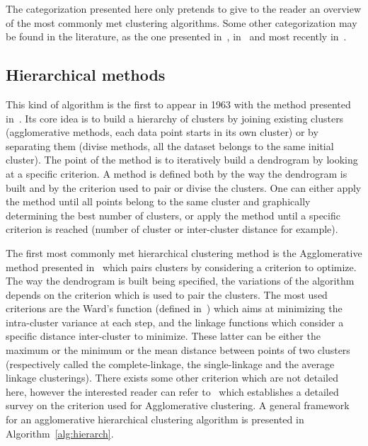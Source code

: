     The categorization presented here only pretends to give to the reader an overview of the most commonly met clustering algorithms. Some other categorization may be found in the literature, as the one presented in~\cite{jain1999data}, in~\cite{xu2005survey} and most recently in~\cite{fahad2014survey}.

    \subsection{Hierarchical methods}

    This kind of algorithm is the first to appear in 1963 with the method presented in~\cite{ward1963hierarchical}. Its core idea is to build a hierarchy of clusters by joining existing clusters (agglomerative methods, each data point starts in its own cluster) or by separating them (divise methods, all the dataset belongs to the same initial cluster). The point of the method is to iteratively build a dendrogram by looking at a specific criterion. A method is defined both by the way the dendrogram is built and by the criterion used to pair or divise the clusters. One can either apply the method until all points belong to the same cluster and graphically determining the best number of clusters, or apply the method until a specific criterion is reached (number of cluster or inter-cluster distance for example).

    The first most commonly met hierarchical clustering method is the Agglomerative method presented in~\cite{ward1963hierarchical} which pairs clusters by considering a criterion to optimize. The way the dendrogram is built being specified, the variations of the algorithm depends on the criterion which is used to pair the clusters. The most used criterions are the Ward's function (defined in~\cite{ward1963hierarchical}) which aims at minimizing the intra-cluster variance at each step, and the linkage functions which consider a specific distance inter-cluster to minimize. These latter can be either the maximum or the minimum or the mean distance between points of two clusters (respectively called the complete-linkage, the single-linkage and the average linkage clusterings). There exists some other criterion which are not detailed here, however the interested reader can refer to~\cite{murtagh1983survey} which establishes a detailed survey on the criterion used for Agglomerative clustering. A general framework for an agglomerative hierarchical clustering algorithm is presented in Algorithm~\ref{alg:hierarch}.\\

